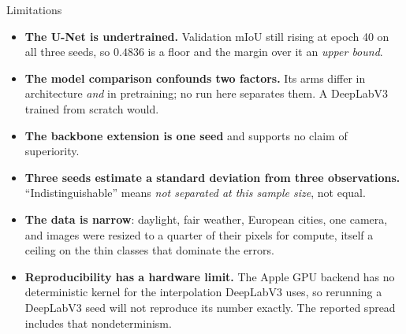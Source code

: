 \begin{frame}{Limitations}
\small
\begin{itemize}
    \item \textbf{The U-Net is undertrained.} Validation mIoU still rising at epoch 40 on all
          three seeds, so $0.4836$ is a floor and the margin over it an \emph{upper bound}.
    \item \textbf{The model comparison confounds two factors.} Its arms differ in architecture \emph{and} in
          pretraining; no run here separates them. A DeepLabV3 trained from scratch would.
    \item \textbf{The backbone extension is one seed} and supports no claim of superiority.
    \item \textbf{Three seeds estimate a standard deviation from three observations.}
          ``Indistinguishable'' means \emph{not separated at this sample size}, not equal.
    \item \textbf{The data is narrow}: daylight, fair weather, European cities, one camera,
          and images were resized to a quarter of their pixels for compute, itself a ceiling on
          the thin classes that dominate the errors.
    \item \textbf{Reproducibility has a hardware limit.} The Apple GPU backend has no deterministic kernel for the
          interpolation DeepLabV3 uses, so rerunning a DeepLabV3 seed will not reproduce its
          number exactly. The reported spread includes that nondeterminism.
\end{itemize}
\end{frame}

